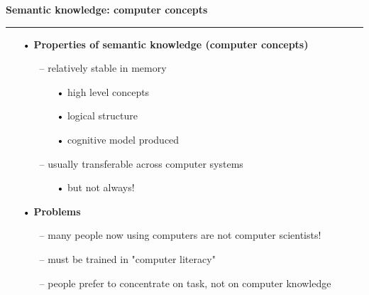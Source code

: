 \documentclass[pdf]{beamer}
\begin{document}
\begin{frame}
\vspace{8mm}
\textcolor{myBlue}{\textbf{\Large{Semantic knowledge: computer concepts}}}

\textcolor{red}{\rule{10cm}{1mm}}

\begin{small}

\begin{itemize}
\item[\textcolor{black}{•}] \textbf{Properties of semantic knowledge (computer concepts)}
     \begin{itemize}
     \item[\textcolor{black}{--}] relatively stable in memory
             \begin{itemize}
             \item[\textcolor{black}{•}] high level concepts
             \item[\textcolor{black}{•}] logical structure
             \item[\textcolor{black}{•}] cognitive model produced\newline
             \end{itemize}
             
      \item[\textcolor{black}{--}] usually transferable across computer systems
             \begin{itemize}
             \item[\textcolor{black}{•}] but not always!\newline
             \end{itemize}
      \end{itemize}
      
\item[\textcolor{black}{•}] \textbf{Problems}
      \begin{itemize}
      \item[\textcolor{black}{--}] many people now using computers are not computer scientists!
      \item[\textcolor{black}{--}] must be trained in "computer literacy"
      \item[\textcolor{black}{--}] people prefer to concentrate on task, not on computer knowledge
      \end{itemize}
\end{itemize}
\medskip
\end{small}
\end{frame}
\end{document}

